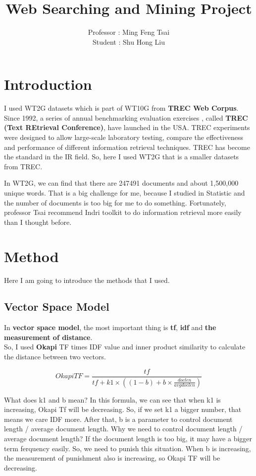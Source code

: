 \documentclass[a4pper,11pt,onecolumn]{article}
\title{Web Searching and Mining Project}
\author{Professor : Ming Feng Tsai\\
        Student : Shu Hong Liu}
\begin{document}
\maketitle

\newpage

\tableofcontents
\newpage
\listoffigures
\newpage

\section{Introduction}
I used WT2G datasets which is part of WT10G from \textbf{TREC Web Corpus}.
Since 1992, a series of annual benchmarking evaluation exercises , called \textbf{TREC (Text REtrieval Conference)}, have launched in the USA. TREC experiments were designed to allow large-scale laboratory testing, compare the effectiveness and performance of different information retrieval techniques. TREC has become the standard in the IR field. So, here I used WT2G that is a smaller datasets from TREC.

In WT2G, we can find that there are 247491 documents and about 1,500,000 unique words. That is a big challenge for me, because I studied in Statistic and the number of documents is too big for me to do something. Fortunately, professor Tsai recommend Indri toolkit to do information retrieval more easily than I thought before.

\section{Method}
Here I am going to introduce the methods that I used.

\subsection{Vector Space Model}
In \textbf{vector space model}, the most important thing is \textbf{tf}, \textbf{idf} and \textbf{the measurement of distance}.\\
So, I used \textbf{Okapi} TF times IDF value and inner product similarity to calculate the distance between two vectors.

\[
    Okapi TF = \frac{tf}{tf + k1 \times ((1 - b) + b \times \frac{doclen}{avgdoclen})}
\]

What does k1 and b mean? In this formula, we can see that when k1 is increasing, Okapi Tf will be decreasing. So, if we set k1 a bigger number, that means we care IDF more. After that, b is a parameter to control document length / average document length. Why we need to control document length / average document length? If the document length is too big, it may have a bigger term ferquency easily. So, we need to punish this situation. When b is increasing, the measurement of punishment also is increasing, so Okapi TF will be decreasing.\\
\end{document}
